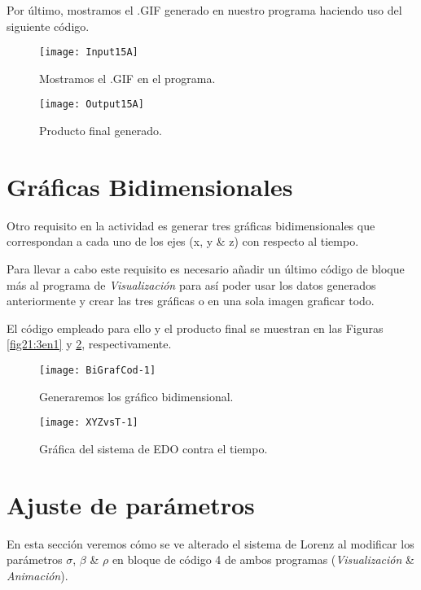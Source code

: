 \vfill
\vline
\space
\par \vspace{2cm}

Por último, mostramos el .GIF generado en nuestro programa haciendo uso del siguiente código.

\begin{figure}[h!]
	\begin{center}
		\texttt{[image: Input15A]}
        \caption{Mostramos el .GIF en el programa.}
        \label{fig19:GeneraGIFCodigo}
        
        \texttt{[image: Output15A]}
        \caption{Producto final generado.}
        \label{fig20:FinalGIF}
        
	\end{center}
\end{figure}

\vfill
\vline
\space
\par \vspace{2cm}

\section{Gráficas Bidimensionales}
Otro requisito en la actividad es generar tres gráficas bidimensionales que correspondan a cada uno de los ejes (x, y \& z) con respecto al tiempo.

Para llevar a cabo este requisito es necesario añadir un último código de bloque más al programa de \textsl{Visualización} para así poder usar los datos generados anteriormente y crear las tres gráficas o en una sola imagen graficar todo.

El código empleado para ello y el producto final se muestran en las Figuras \ref{fig21:3en1} y \ref{fig22:3en1Graf}, respectivamente.

\begin{figure}[h!]
	\begin{center}
		\texttt{[image: BiGrafCod-1]}
        \caption{Generaremos los gráfico bidimensional.}
        \label{fig21:3en1}
        
        \texttt{[image: XYZvsT-1]}
        \caption{Gráfica del sistema de EDO contra el tiempo.}
        \label{fig22:3en1Graf}
        
	\end{center}
\end{figure}

\section{Ajuste de parámetros}
En esta sección veremos cómo se ve alterado el sistema de Lorenz al modificar los parámetros $\sigma$, $\beta$ \& $\rho$ en bloque de código 4 de ambos programas (\textsl{Visualización} \& \textsl{Animación}).

